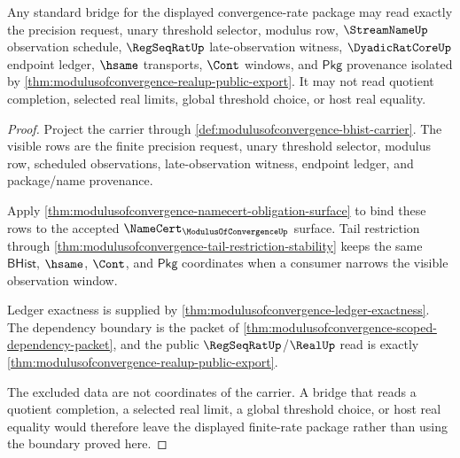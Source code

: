\begin{theorem}\label{thm:modulusofconvergence-finite-rate-bridge-packet}
Any standard bridge for the displayed convergence-rate package may read exactly
the precision request, unary threshold selector, modulus row,
$\StreamNameUp$ observation schedule, $\RegSeqRatUp$ late-observation witness,
$\DyadicRatCoreUp$ endpoint ledger, $\hsame$ transports, $\Cont$ windows, and
$\mathsf{Pkg}$ provenance isolated by
\autoref{thm:modulusofconvergence-realup-public-export}. It may not read
quotient completion, selected real limits, global threshold choice, or host real
equality.
\end{theorem}
\begin{proof}
Project the carrier through \autoref{def:modulusofconvergence-bhist-carrier}.
The visible rows are the finite precision request, unary threshold selector,
modulus row, scheduled observations, late-observation witness, endpoint ledger,
and package/name provenance.

Apply \autoref{thm:modulusofconvergence-namecert-obligation-surface} to bind
these rows to the accepted $\NameCert_{\ModulusOfConvergenceUp}$ surface. Tail
restriction through
\autoref{thm:modulusofconvergence-tail-restriction-stability} keeps the same
$\mathsf{BHist}$, $\hsame$, $\Cont$, and $\mathsf{Pkg}$ coordinates when a
consumer narrows the visible observation window.

Ledger exactness is supplied by
\autoref{thm:modulusofconvergence-ledger-exactness}. The dependency boundary is
the packet of \autoref{thm:modulusofconvergence-scoped-dependency-packet}, and
the public $\RegSeqRatUp$/$\RealUp$ read is exactly
\autoref{thm:modulusofconvergence-realup-public-export}.

The excluded data are not coordinates of the carrier. A bridge that reads a
quotient completion, a selected real limit, a global threshold choice, or host
real equality would therefore leave the displayed finite-rate package rather
than using the boundary proved here.
\end{proof}

